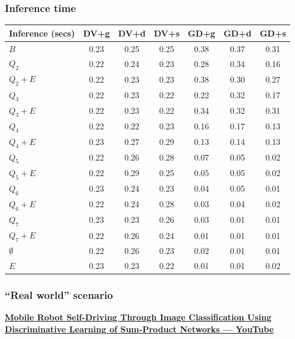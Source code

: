 \documentclass{beamer}
\begin{document}
\begin{frame}
  \frametitle{Inference time}
  \footnotesize
  \begin{table}[h]
    \centering
    \begin{tabular}{l|c|c|c|c|c|c}
      \hline
      \multicolumn{1}{c}{\bfseries Inference (secs)} & \multicolumn{1}{c}{\bfseries DV+g} &
      \multicolumn{1}{c}{\bfseries DV+d} & \multicolumn{1}{c}{\bfseries DV+s} &
      \multicolumn{1}{c}{\bfseries GD+g} & \multicolumn{1}{c}{\bfseries GD+d} &
      \multicolumn{1}{c}{\bfseries GD+s}\\
      \hline
      $B$         & 0.23 & 0.25 & 0.25 & 0.38 & 0.37 & 0.31 \\
      $Q_2$       & 0.22 & 0.24 & 0.23 & 0.28 & 0.34 & 0.16 \\
      $Q_2+E$     & 0.22 & 0.23 & 0.23 & 0.38 & 0.30 & 0.27 \\
      $Q_3$       & 0.22 & 0.23 & 0.22 & 0.22 & 0.32 & 0.17 \\
      $Q_3+E$     & 0.22 & 0.23 & 0.22 & 0.34 & 0.32 & 0.31 \\
      $Q_4$       & 0.22 & 0.22 & 0.23 & 0.16 & 0.17 & 0.13 \\
      $Q_4+E$     & 0.23 & 0.27 & 0.29 & 0.13 & 0.14 & 0.13 \\
      $Q_5$       & 0.22 & 0.26 & 0.28 & 0.07 & 0.05 & 0.02 \\
      $Q_5+E$     & 0.22 & 0.29 & 0.25 & 0.05 & 0.05 & 0.02 \\
      $Q_6$       & 0.23 & 0.24 & 0.23 & 0.04 & 0.05 & 0.01 \\
      $Q_6+E$     & 0.22 & 0.24 & 0.28 & 0.03 & 0.04 & 0.02 \\
      $Q_7$       & 0.23 & 0.23 & 0.26 & 0.03 & 0.01 & 0.01 \\
      $Q_7+E$     & 0.22 & 0.26 & 0.24 & 0.01 & 0.01 & 0.01 \\
      $\emptyset$ & 0.22 & 0.26 & 0.23 & 0.02 & 0.01 & 0.01 \\
      $E$         & 0.23 & 0.23 & 0.22 & 0.01 & 0.01 & 0.02 \\
    \end{tabular}
  \end{table}
\end{frame}

\begin{frame}
  \frametitle{``Real world'' scenario}

  \footnotesize\centering\textbf{\href{https://}{Mobile Robot Self-Driving Through Image Classification Using
  Discriminative Learning of Sum-Product Networks --- YouTube}}
\end{frame}
\end{document}
